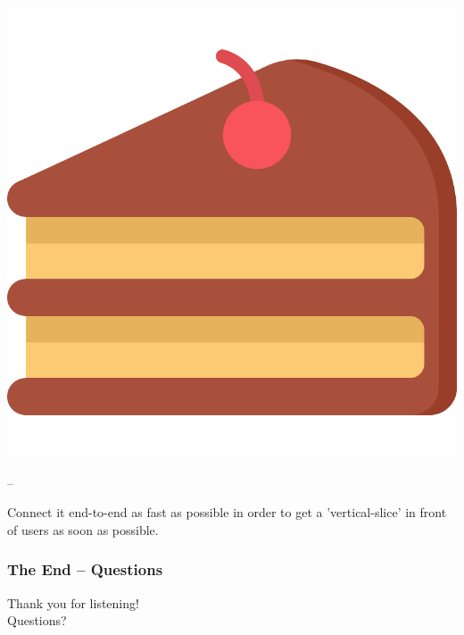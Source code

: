 \documentclass[xcolor=svgnames,10pt,aspectratio=1610]{beamer}
\begin{document}
\begin{frame}
\begin{minipage}{.7\textwidth}
\begin{minipage}{0.05\textwidth}
      \includegraphics[width=\textwidth]{img/slice.pdf}
    \end{minipage}
    \hspace{0.15cm}
    --
    \hspace{0.15cm}
    \begin{minipage}{0.9\textwidth}
      Connect it end-to-end as fast as possible in order to get a
      'vertical-slice' in front of users as soon as possible.
    \end{minipage}
  \end{minipage}
\end{frame}

\begin{frame}
  \frametitle{The End -- Questions}
  \begin{center}
    {\huge
    Thank you for listening! \\
    \vspace{1cm}
    Questions?
    }
  \end{center}
\end{frame}
\end{document}
